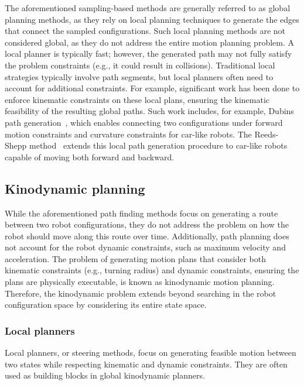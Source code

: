 The aforementioned sampling-based methods are generally referred to as global planning methods, as they rely on local planning techniques to generate the edges that connect the sampled configurations.
Such local planning methods are not considered global, as they do not address the entire motion planning problem. 
A local planner is typically fast; however, the generated path may not fully satisfy the problem constraints (e.g., it could result in collisions).
Traditional local strategies typically involve path segments, but local planners often need to account for additional constraints.
For example, significant work has been done to enforce kinematic constraints on these local plans, ensuring the kinematic feasibility of the resulting global paths.
Such work includes, for example, Dubins path generation~\cite{cDubins}, which enables connecting two configurations under forward motion constraints and curvature constraints for car-like robots. 
The Reeds-Shepp method~\cite{cReeds} extends this local path generation procedure to car-like robots capable of moving both forward and backward.

\subsection{Kinodynamic planning}

While the aforementioned path finding methods focus on generating a route between two robot configurations, they do not address the problem on how the robot should move along this route over time.
Additionally, path planning does not account for the robot dynamic constraints, such as maximum velocity and acceleration. 
The problem of generating motion plans that consider both kinematic constraints (e.g., turning radius) and dynamic constraints, ensuring the plans are physically executable, is known as kinodynamic motion planning.
Therefore, the kinodynamic problem extends beyond searching in the robot configuration space by considering its entire state space.

\subsubsection{Local planners}

Local planners, or steering methods, focus on generating feasible motion between two states while respecting kinematic and dynamic constraints. 
They are often used as building blocks in global kinodynamic planners. 

